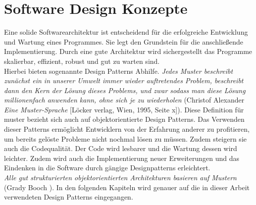\section{Software Design Konzepte}
Eine solide Softwarearchitektur ist entscheidend für die erfolgreiche Entwicklung und Wartung eines Programmes. Sie legt den Grundstein für die anschließende Implementierung. Durch eine gute Architektur wird sichergestellt das Programme skalierbar, effizient, robust und gut zu warten sind.\\
Hierbei bieten sogenannte Design Patterns Abhilfe. \textit{Jedes Muster beschreibt zunächst ein in unserer Umwelt immer wieder auftretendes Problem, beschreibt dann den Kern der Lösung dieses Problems, und zwar sodass man diese Lösung millionenfach anwenden kann, ohne sich je zu wiederholen} (Christof Alexander \textit{Eine Muster-Sprache} [Löcker verlag, Wien, 1995, Seite x]). Diese Definition für muster bezieht sich auch auf objektorientierte Design Patterns. Das Verwenden dieser Patterns ermöglicht Entwicklern von der Erfahrung anderer zu profitieren, um bereits gelöste Probleme nicht nochmal lösen zu müssen. Zudem steigern sie auch die Codequalität. Der Code wird lesbarer und die Wartung dessen wird leichter. Zudem wird auch die Implementierung neuer Erweiterungen und das Eindenken in die Software durch gängige Designpatterns erleichtert. \cite[S.25 ff]{DesignPatterns}\\
\textit{Alle gut strukturierten objektorientierten Architekturen basieren auf Mustern} (Grady Booch \cite[S.21]{DesignPatterns}).
In den folgenden Kapiteln wird genauer auf die in dieser Arbeit verwendeten Design Patterns eingegangen.      

